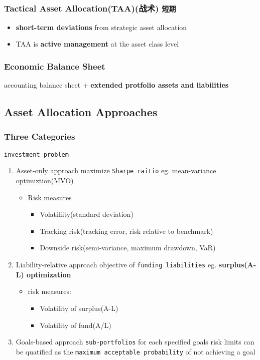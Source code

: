 \documentclass[12pt,a4paper]{article}
\begin{document}
\subsubsection{Tactical Asset Allocation(TAA)(战术) \texttt{短期}}
\label{sec:org6a6f4da}
\begin{itemize}
\item \textbf{short-term deviations} from strategic asset allocation
\item TAA is \textbf{active management} at the asset class level
\end{itemize}
\subsubsection{Economic Balance Sheet}
\label{sec:org7cb8bd5}
accounting balance sheet + \textbf{extended protfolio assets and liabilities}
\subsection{Asset Allocation Approaches}
\label{sec:org2276592}
\subsubsection{Three Categories}
\label{sec:orgea39829}
\texttt{investment problem}
\begin{enumerate}
\item Asset-only approach
\label{sec:orgce3479f}
maximize \texttt{Sharpe raitio}
eg. \uline{mean-variance optimiztion(MVO)}
\begin{itemize}
\item Risk measures
\begin{itemize}
\item Volatiliity(standard deviation)
\item Tracking risk(tracking error, risk relative to benchmark)
\item Downside risk(semi-variance, maximum drawdown, VaR)
\end{itemize}
\end{itemize}
\item Liability-relative approach
\label{sec:org3bc14a5}
objective of \texttt{funding liabilities}
eg. \textbf{surplus(A-L) optimization}
\begin{itemize}
\item risk measures:
\begin{itemize}
\item Volatility of surplus(A-L)
\item Volatility of fund(A/L)
\end{itemize}
\end{itemize}
\item Goals-based approach
\label{sec:orga75cde9}
\texttt{sub-portfolios} for each specified goals
risk limits can be quatified as the \texttt{maximum acceptable probability} of not achieving a goal
\end{enumerate}
\end{document}
